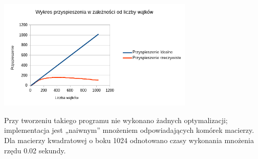 \documentclass[a4paper,12pt]{article}
\begin{document}
\begin{center}
\includegraphics[width=0.7\textwidth]{data/przyspieszenie.png}
\end{center}

Przy tworzeniu takiego programu nie wykonano żadnych optymalizacji; implementacja jest „naiwnym” mnożeniem odpowiadających komórek macierzy.
\\
Dla macierzy kwadratowej o boku 1024 odnotowano czasy wykonania mnożenia rzędu 0.02 sekundy.\\
\end{document}
